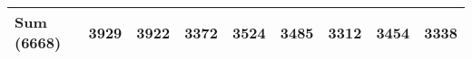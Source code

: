 \begin{tabular}{lrrrrrrrr}
    \midrule
    \textbf{Sum (6668)}      & \textbf{3929}                            & 3922                                                                   & 3372                                                & 3524                                   & 3485                                            & 3312                                             & 3454                                   & 3338                                             \\
    \bottomrule
\end{tabular}
